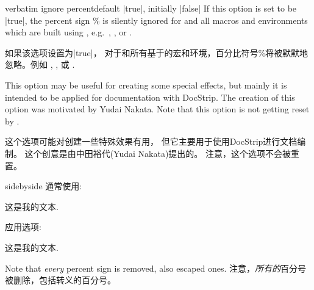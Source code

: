 \begin{docTcbKey}[][doc new=2017-07-05]{verbatim ignore percent}{}{default |true|, initially |false|}
If this option is set to be |true|, the percent sign \% is silently
ignored for  and all macros and environments
which are built using , e.g.\ 
, , or .\par
如果该选项设置为|true|，%
对于和所有基于的宏和环境，百分比符号\%将被默默地忽略。例如 , , 或 .\par


This option may be useful for creating some special effects, but mainly
it is intended to be applied for documentation with DocStrip.
The creation of this option was motivated by Yudai Nakata.
Note that this option is not getting reset by .

这个选项可能对创建一些特殊效果有用，%
但它主要用于使用DocStrip进行文档编制。%
这个创意是由中田裕代(Yudai Nakata)提出的。%
注意，这个选项不会被重置。

\begin{dispExample*}{sidebyside}
通常使用:
\begin{tcbwritetemp}
这是我的文本.
\end{tcbwritetemp}

\tcbusetemp

\bigskip 应用选项:
\begin{tcbwritetemp}
这是我的文本.
\end{tcbwritetemp}

\tcbusetemp
\end{dispExample*}

\begin{marker}
\begin{stripedbox}
Note that \emph{every} percent sign is removed, also escaped ones.
\tcblower
注意，\emph{所有的}百分号被删除，包括转义的百分号。
\end{stripedbox}
\end{marker}


\end{docTcbKey}
